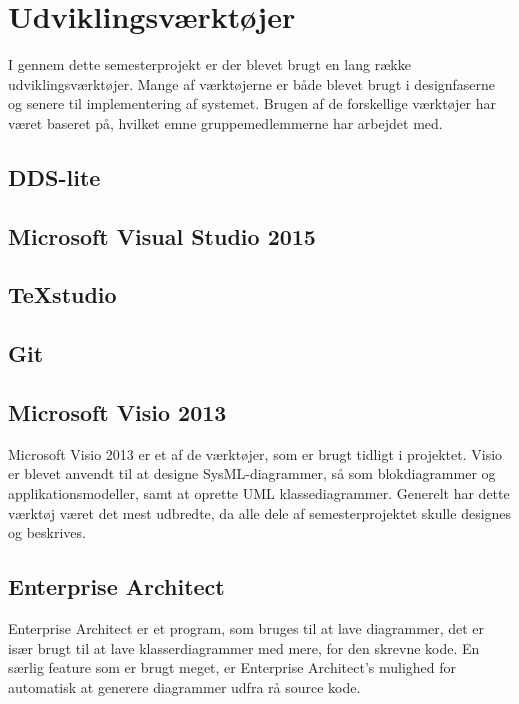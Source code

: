 \chapter{Udviklingsværktøjer}

I gennem dette semesterprojekt er der blevet brugt en lang række udviklingsværktøjer. Mange af værktøjerne er både blevet brugt i designfaserne og senere til implementering af systemet. Brugen af de forskellige værktøjer har været baseret på, hvilket emne gruppemedlemmerne har arbejdet med.

\section*{DDS-lite}

\section*{Microsoft Visual Studio 2015}

\section*{TeXstudio}

\section*{Git}

\section*{Microsoft Visio 2013}

Microsoft Visio 2013 er et af de værktøjer, som er brugt tidligt i projektet. Visio er blevet anvendt til at designe SysML-diagrammer, så som blokdiagrammer og applikationsmodeller, samt at oprette UML klassediagrammer. Generelt har dette værktøj været det mest udbredte, da alle dele af semesterprojektet skulle designes og beskrives.

\section*{Enterprise Architect}

Enterprise Architect er et program, som bruges til at lave diagrammer, det er især brugt til at lave klasserdiagrammer med mere, for den skrevne kode. En særlig feature som er brugt meget, er Enterprise Architect's mulighed for automatisk at generere diagrammer udfra rå source kode.